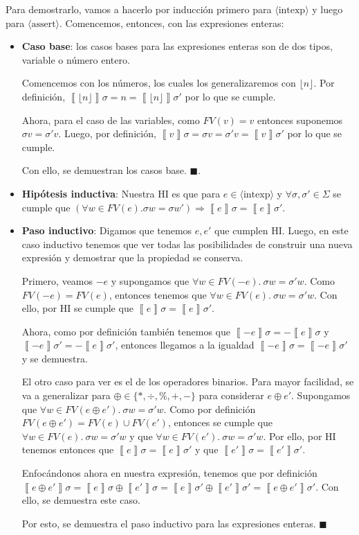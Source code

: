 \documentclass{article}
\newcommand{\aexp}[1]{\langle\text{#1}\rangle}
\newcommand{\intexp}{\aexp{intexp}}
\newcommand{\assert}{\aexp{assert}}
\newcommand{\sem}[1]{\left\llbracket #1\right\rrbracket}
\begin{document}
Para demostrarlo, vamos a hacerlo por inducción primero para $\intexp$ y luego para $\assert$.
Comencemos, entonces, con las expresiones enteras:
\begin{itemize}
	\item \textbf{Caso base}: los casos bases para las expresiones enteras son de dos tipos, variable o número entero.

	      Comencemos con los números, los cuales los generalizaremos con $\lfloor n\rfloor$.
	      Por definición, $\sem{\lfloor n\rfloor} \sigma = n = \sem{\lfloor n\rfloor} \sigma'$ por lo que se cumple.

	      Ahora, para el caso de las variables, como $FV(v) = v$ entonces suponemos $\sigma v = \sigma' v$.
	      Luego, por definición, $\sem{v} \sigma = \sigma v = \sigma' v = \sem{v} \sigma'$ por lo que se cumple.

	      Con ello, se demuestran los casos base. $\blacksquare$.

	\item \textbf{Hipótesis inductiva}: Nuestra HI es que para $e \in \intexp$ y $\forall \sigma, \sigma' \in \Sigma$ se cumple que $(\forall w \in FV(e). \sigma w = \sigma w') \Rightarrow \sem{e} \sigma = \sem{e} \sigma'$.
	\item \textbf{Paso inductivo}: Digamos que tenemos $e, e'$ que cumplen HI.
	      Luego, en este caso inductivo tenemos que ver todas las posibilidades de construir una nueva expresión y demostrar que la propiedad se conserva.

	      Primero, veamos $-e$ y supongamos que $\forall w \in FV(-e).\ \sigma w = \sigma' w$.
	      Como $FV(-e) = FV(e)$, entonces tenemos que $\forall w \in FV(e).\ \sigma w = \sigma' w$.
	      Con ello, por HI se cumple que $\sem{e} \sigma = \sem{e} \sigma'$.

	      Ahora, como por definición también tenemos que $\sem{-e} \sigma = -\sem{e} \sigma$ y $\sem{-e} \sigma' = -\sem{e} \sigma'$, entonces llegamos a la igualdad $\sem{-e} \sigma = \sem{-e} \sigma'$ y se demuestra.

	      El otro caso para ver es el de los operadores binarios.
	      Para mayor facilidad, se va a generalizar para $\oplus \in \{ * , \div , \% , + , -\}$ para considerar $e \oplus e'$.
	      Supongamos que $\forall w \in FV(e \oplus e').\ \sigma w = \sigma' w$.
	      Como por definición $FV(e \oplus e') = FV(e) \cup FV(e')$, entonces se cumple que $\forall w \in FV(e).\ \sigma w = \sigma' w$ y que $\forall w \in FV(e').\ \sigma w = \sigma' w$.
	      Por ello, por HI tenemos entonces que $\sem{e} \sigma = \sem{e} \sigma'$ y que $\sem{e'} \sigma = \sem{e'} \sigma'$.

	      Enfocándonos ahora en nuestra expresión, tenemos que por definición $\sem{e \oplus e'} \sigma = \sem{e} \sigma \oplus \sem{e'} \sigma = \sem{e} \sigma' \oplus \sem{e'} \sigma' = \sem{e \oplus e'} \sigma'$.
	      Con ello, se demuestra este caso.

	      Por esto, se demuestra el paso inductivo para las expresiones enteras. $\blacksquare$
\end{itemize}
\end{document}
